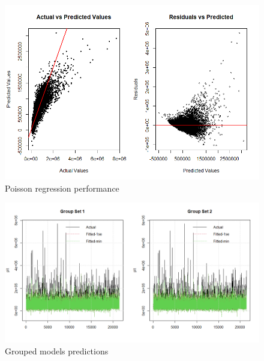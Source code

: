\documentclass[a4paper, 11pt]{article}
\begin{document}
\begin{figure}[H]
\includegraphics[scale=0.65]{MGLMperf}
\centering
\caption{Poisson regression performance}
\label{fig:MGLMperf}
\end{figure}


\begin{figure}[H]
\includegraphics[scale=0.6]{gglassopred}
\centering
\caption{Grouped models predictions}
\label{fig:gglassopred}
\end{figure}
\end{document}
